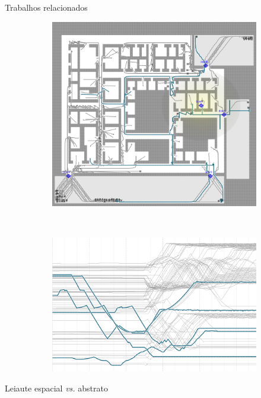 \begin{frame}{Trabalhos relacionados}
\begin{figure}[ht!]
  \centering
  \begin{subfigure}[t]{0.45\textwidth}
    \centering
    \includegraphics[width=\textwidth]{../figuras/proximidade-espacial.png}
  \end{subfigure}
  ~
  \begin{subfigure}[t]{0.45\textwidth}
    \centering
    \includegraphics[width=\textwidth]{../figuras/proximidade-abstrata.png}
  \end{subfigure}
\end{figure}
  \centering
  Leiaute espacial \emph{vs.} abstrato
\end{frame}

